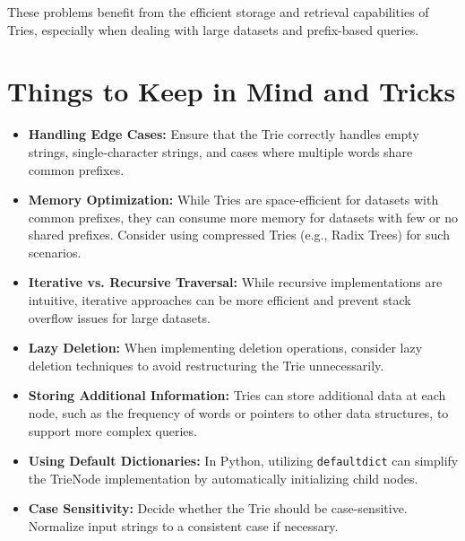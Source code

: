 These problems benefit from the efficient storage and retrieval capabilities of Tries, especially when dealing with large datasets and prefix-based queries.

\section*{Things to Keep in Mind and Tricks}

\begin{itemize}
    \item \textbf{Handling Edge Cases:} Ensure that the Trie correctly handles empty strings, single-character strings, and cases where multiple words share common prefixes.
    
    \item \textbf{Memory Optimization:} While Tries are space-efficient for datasets with common prefixes, they can consume more memory for datasets with few or no shared prefixes. Consider using compressed Tries (e.g., Radix Trees) for such scenarios.
    
    \item \textbf{Iterative vs. Recursive Traversal:} While recursive implementations are intuitive, iterative approaches can be more efficient and prevent stack overflow issues for large datasets.
    
    \item \textbf{Lazy Deletion:} When implementing deletion operations, consider lazy deletion techniques to avoid restructuring the Trie unnecessarily.
    
    \item \textbf{Storing Additional Information:} Tries can store additional data at each node, such as the frequency of words or pointers to other data structures, to support more complex queries.
    
    \item \textbf{Using Default Dictionaries:} In Python, utilizing \texttt{defaultdict} can simplify the TrieNode implementation by automatically initializing child nodes.
    
    \item \textbf{Case Sensitivity:} Decide whether the Trie should be case-sensitive. Normalize input strings to a consistent case if necessary.
\end{itemize}

